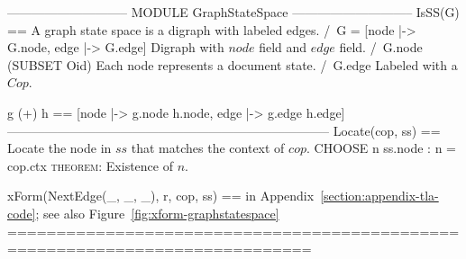 \documentclass{article}
\begin{document}
\begin{tla}
----------------------------- MODULE GraphStateSpace -----------------------------
IsSS(G) == \* A graph state space is a digraph with labeled edges.
    /\ G = [node |-> G.node, edge |-> G.edge] \* Digraph with $node$ field and $edge$ field.
    /\ G.node \subseteq (SUBSET Oid) \* Each node represents a document state.
    /\ G.edge  \* Labeled with a $Cop$.

g (+) h == [node |-> g.node \cup h.node, edge |-> g.edge \cup h.edge]
-----------------------------------------------------------------------------
Locate(cop, ss) == \* Locate the node in $ss$ that matches the context of $cop$.     
    CHOOSE n \in ss.node : n = cop.ctx \* \textsc{theorem}: Existence of $n$.

xForm(NextEdge(_, _, _), r, cop, ss) == \* in Appendix~\ref{section:appendix-tla-code}; see also Figure~\ref{fig:xform-graphstatespace}
=============================================================================
\end{tla}
\end{document}
